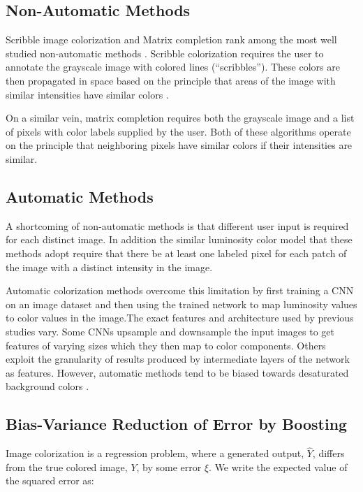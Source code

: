 \documentclass[10pt,twocolumn,letterpaper]{article}
\begin{document}
\subsection{Non-Automatic Methods}
Scribble image colorization and Matrix completion rank among the most well studied non-automatic methods \cite{Charpiat2010,Levin2004,Charpiat2008}. Scribble colorization requires the user to annotate the grayscale image with colored lines (“scribbles”). These colors are then propagated in space based on the principle that areas of the image with similar intensities have similar colors \cite{Levin2004}.

On a similar vein, matrix completion requires both the grayscale image and a list of pixels with color labels supplied by the user. Both of these algorithms operate on the principle that neighboring pixels have similar colors if their intensities are similar.

\subsection{Automatic Methods}
A shortcoming of non-automatic methods is that different user input is required for each distinct image. In addition the similar luminosity color model that these methods adopt require that there be at least one labeled pixel for each patch of the image with a distinct intensity in the image.

Automatic colorization methods overcome this limitation by first training a CNN on an image dataset and then using the trained network to map luminosity values to color values in the image.The exact features and architecture used by previous studies vary. Some CNNs upsample and downsample the input images to get features of varying sizes which they then map to color components\cite{Zhang2016}. Others exploit the granularity of results produced by intermediate layers of the network as features\cite{Larsson2016}. However, automatic methods tend to be biased towards desaturated background colors \cite{Charpiat2008}.

\subsection{Bias-Variance Reduction of Error by Boosting}
Image colorization is a regression problem, where a generated output, $\hat{Y}$, differs from the true colored image, $Y$, by some error $\xi$. We write the expected value of the squared error as:\newline
\end{document}
